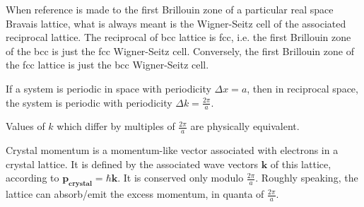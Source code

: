 \documentclass[a4paper]{article}
\begin{document}
\begin{eg}
When reference is made to the first Brillouin zone of a particular real space Bravais lattice, what is always meant is the Wigner-Seitz cell of the associated reciprocal lattice. The reciprocal of bcc lattice is fcc, i.e. the first Brillouin zone of the bcc is just the fcc Wigner-Seitz cell. Conversely, the first Brillouin zone of the fcc lattice is just the bcc Wigner-Seitz cell.
\end{eg}
\begin{thm}
If a system is periodic in space with periodicity $\Delta x=a$, then in reciprocal space, the system is periodic with periodicity $\Delta k=\frac{2\pi}{a}$.
\end{thm}
\begin{cor}
Values of $k$ which differ by multiples of $\frac{2\pi}{a}$ are physically equivalent.
\end{cor}

\begin{defi}
Crystal momentum is a momentum-like vector associated with electrons in a crystal lattice. It is defined by the associated wave vectors $\mathbf{k}$  of this lattice, according to $\mathbf{p_{crystal}}=\hbar\mathbf{k}$. It is conserved only modulo $\frac{2\pi}{a}$. Roughly speaking, the lattice can absorb/emit the excess momentum, in quanta of $\frac{2\pi}{a}$.
\end{defi}
\newpage
\end{document}
